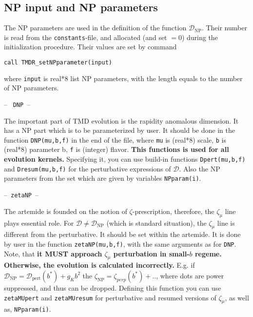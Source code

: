 \documentclass[prd,nofootinbib,eqsecnum,final]{revtex4}
\renewcommand{\(}{\left(}
\renewcommand{\)}{\right)}
\renewcommand{\[}{\left[}
\renewcommand{\]}{\right]}
\begin{document}
\subsection{NP input and NP parameters}
\label{TMDR:NP}

The NP parameters are used in the definition of the function $\mathcal{D}_\text{NP}$. Their number is read from the \texttt{constants}-file, and allocated (and set $=0$) during the initialization procedure. Their values are set by command

\texttt{call TMDR{\_}setNPparameter(input)}

where \texttt{input} is real*8 list NP parameters, with the length equals to the number of NP parameters.

\begin{center}
-- ~\texttt{DNP}~--
\end{center}

The important part of TMD evolution is the rapidity anomalous dimension. It has a NP part which is to be parameterized by user. It should be done in the function \texttt{DNP(mu,b,f)} in the end of the file, where \texttt{mu} is (real*8) scale, \texttt{b} is (real*8) parameter b, \texttt{f} is (integer) flavor. \textbf{This functions is used for all evolution kernels.} Specifying it, you can use build-in functions \texttt{Dpert(mu,b,f)} and \texttt{Dresum(mu,b,f)} for the perturbative expressions of $\mathcal{D}$. Also the NP parameters from the set which are given by variables \texttt{NPparam(i)}.

\begin{center}
--~\texttt{zetaNP}~--
\end{center}

The artemide is founded on the notion of $\zeta$-prescription, therefore, the $\zeta_\mu$ line plays essential role. For $\mathcal{D}\neq \mathcal{D}_{\text{NP}}$ (which is standard situation), the $\zeta_\mu$ line is different from the perturbative. It should be set within the artemide. It is done by user in the function \texttt{zetaNP(mu,b,f)}, with the same arguments as for \texttt{DNP}. Note, that \textbf{it MUST approach $\zeta_\mu$ perturbation in small-$b$ regeme. Otherwise, the evolution is calculated incorrectly.} E.g. if $\mathcal{D}_{\text{NP}}=\mathcal{D}_{\text{pert}}(b^*)+g_Kb^2$ the $\zeta_{\text{NP}}=\zeta_{perp}(b^*)+..$, where dots are power suppressed, and thus can be dropped. Defining this function you can use \texttt{zetaMUpert} and \texttt{zetaMUresum} for perturbative and resumed versions of $\zeta_\mu$, as well as, \texttt{NPparam(i)}.
\end{document}
